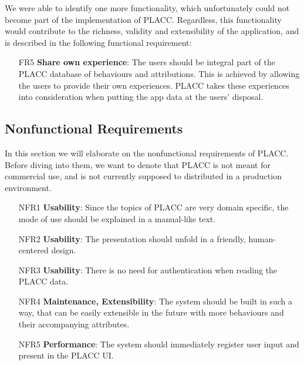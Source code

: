 We were able to identify one more functionality, which unfortunately could not become part of the implementation of PLACC. Regardless, this functionality would contribute to the richness,  validity and extensibility of the application, and is described in the following functional requirement:

\begin{itemize}
\item [FR5] \textbf{Share own experience}: The users should be integral part of the PLACC database of behaviours and attributions. This is achieved by allowing the users to provide their own experiences. PLACC takes these experiences into consideration when putting the app data at the users' disposal.
\end{itemize}

\subsection{Nonfunctional Requirements}


In this section we will elaborate on the nonfunctional requirements of PLACC. Before diving into them, we want to denote that PLACC is not meant for commercial use, and is not currently supposed to distributed in a production environment. 

\begin{itemize}
\item [NFR1] \textbf{Usability}: Since the topics of PLACC are very domain specific, the mode of use should be explained in a manual-like text.
\item [NFR2] \textbf{Usability}: The presentation should unfold in a friendly, human-centered design.
\item [NFR3] \textbf{Usability}: There is no need for authentication when reading the PLACC data.
\item [NFR4] \textbf{Maintenance,  Extensibility}: The system should be built in such a way,  that can be easily extensible in the future with more behaviours and their accompanying attributes.
\item [NFR5] \textbf{Performance}: The system should immediately register user input and present in the PLACC UI.
\end{itemize}

